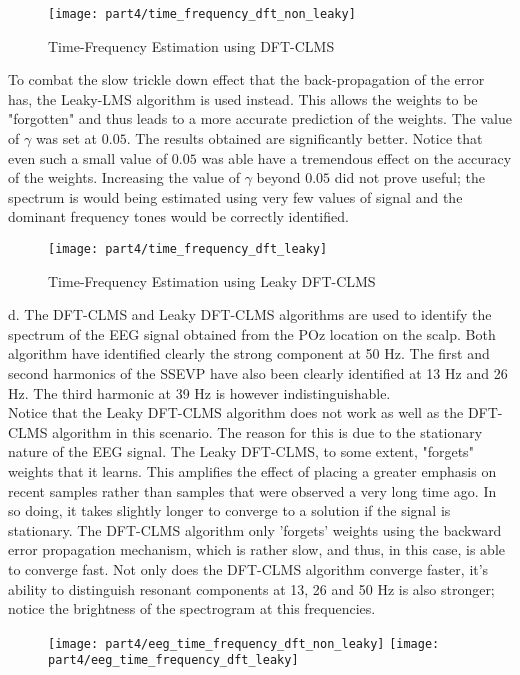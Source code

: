 \begin{figure}[H]
\centering{}
\texttt{[image: part4/time\_frequency\_dft\_non\_leaky]}
\caption{Time-Frequency Estimation using DFT-CLMS}
\end{figure}

\noindent{}To combat the slow trickle down effect that the back-propagation of the error has, the Leaky-LMS algorithm is used instead. This allows the weights to be "forgotten" and thus leads to a more accurate prediction of the weights. The value of $\gamma$ was set at $0.05$. The results obtained are significantly better. Notice that even such a small value of $0.05$ was able have a tremendous effect on the accuracy of the weights. Increasing the value of $\gamma$ beyond $0.05$ did not prove useful; the spectrum is would being estimated using very few values of signal and the dominant frequency tones would be correctly identified. 

\begin{figure}[H]
\centering{}
\texttt{[image: part4/time\_frequency\_dft\_leaky]}
\caption{Time-Frequency Estimation using Leaky DFT-CLMS}
\end{figure}

\noindent{}d. The DFT-CLMS and Leaky DFT-CLMS algorithms are used to identify the spectrum of the EEG signal obtained from the POz location on the scalp. Both algorithm have identified clearly the strong component at 50 Hz. The first and second harmonics of the SSEVP have also been clearly identified at 13 Hz and 26 Hz. The third harmonic at 39 Hz is however indistinguishable. \\

\noindent{}Notice that the Leaky DFT-CLMS algorithm does not work as well as the DFT-CLMS algorithm in this scenario. The reason for this is due to the stationary nature of the EEG signal. The Leaky DFT-CLMS, to some extent, "forgets" weights that it learns. This amplifies the effect of placing a greater emphasis on recent samples rather than samples that were observed a very long time ago.  In so doing, it takes slightly longer to converge to a solution if the signal is stationary. The DFT-CLMS algorithm only 'forgets' weights using the backward error propagation mechanism, which is rather slow, and thus, in this case, is able to converge fast. Not only does the DFT-CLMS algorithm converge faster, it's ability to distinguish resonant components at 13, 26 and 50 Hz is also stronger; notice the brightness of the spectrogram at this frequencies. 

\begin{figure}[H]
\centering{}
\texttt{[image: part4/eeg\_time\_frequency\_dft\_non\_leaky]}
\texttt{[image: part4/eeg\_time\_frequency\_dft\_leaky]}
\caption{}
\end{figure}





